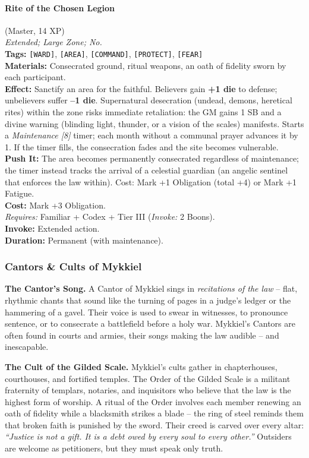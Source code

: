 \paragraph{Rite of the Chosen Legion} (Master, 14 XP) \hfill \\
\emph{Extended; Large Zone; No.} \\
\textbf{Tags:} \texttt{[WARD]}, \texttt{[AREA]}, \texttt{[COMMAND]}, \texttt{[PROTECT]}, \texttt{[FEAR]} \\
\textbf{Materials:} Consecrated ground, ritual weapons, an oath of fidelity sworn by each participant. \\
\textbf{Effect:} Sanctify an area for the faithful. Believers gain \textbf{+1 die} to defense; unbelievers suffer \textbf{--1 die}. Supernatural desecration (undead, demons, heretical rites) within the zone risks immediate retaliation: the GM gains 1 SB and a divine warning (blinding light, thunder, or a vision of the scales) manifests. Starts a \textit{Maintenance [8]} timer; each month without a communal prayer advances it by 1. If the timer fills, the consecration fades and the site becomes vulnerable. \\
\textbf{Push It:} The area becomes permanently consecrated regardless of maintenance; the timer instead tracks the arrival of a celestial guardian (an angelic sentinel that enforces the law within). Cost: Mark +1 Obligation (total +4) or Mark +1 Fatigue. \\
\textbf{Cost:} Mark +3 Obligation. \\
\textit{Requires:} Familiar + Codex + Tier III (\textit{Invoke:} 2 Boons). \\
\textbf{Invoke:} Extended action. \\
\textbf{Duration:} Permanent (with maintenance).

\subsubsection*{Cantors \& Cults of Mykkiel}

\textbf{The Cantor's Song.} A Cantor of Mykkiel sings in \textit{recitations of the law} -- flat, rhythmic chants that sound like the turning of pages in a judge's ledger or the hammering of a gavel. Their voice is used to swear in witnesses, to pronounce sentence, or to consecrate a battlefield before a holy war. Mykkiel's Cantors are often found in courts and armies, their songs making the law audible -- and inescapable.

\textbf{The Cult of the Gilded Scale.} Mykkiel's cults gather in chapterhouses, courthouses, and fortified temples. The Order of the Gilded Scale is a militant fraternity of templars, notaries, and inquisitors who believe that the law is the highest form of worship. A ritual of the Order involves each member renewing an oath of fidelity while a blacksmith strikes a blade -- the ring of steel reminds them that broken faith is punished by the sword. Their creed is carved over every altar: \textit{``Justice is not a gift. It is a debt owed by every soul to every other.''} Outsiders are welcome as petitioners, but they must speak only truth.

